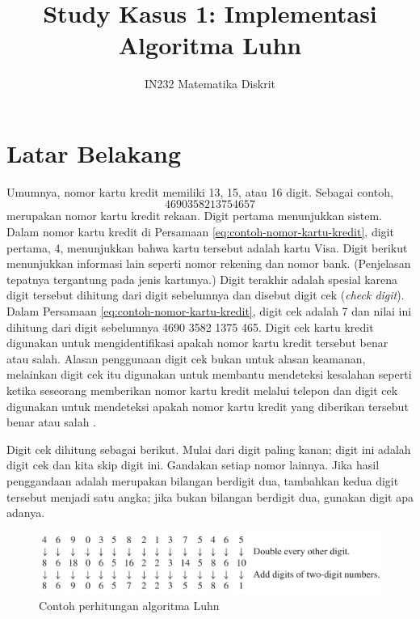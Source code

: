 \documentclass{article}
\title{Study Kasus 1: Implementasi Algoritma Luhn}
\author{IN232 Matematika Diskrit}
\date{}
\theoremstyle{plain}
\begin{document}
\maketitle


\section*{Latar Belakang}
Umumnya, nomor kartu kredit memiliki 13, 15, atau 16 digit. Sebagai contoh,
\begin{equation}
	4690 3582 1375 4657
	\label{eq:contoh-nomor-kartu-kredit}
\end{equation}
merupakan nomor kartu kredit rekaan. Digit pertama menunjukkan sistem. Dalam nomor kartu kredit di Persamaan \eqref{eq:contoh-nomor-kartu-kredit}, digit pertama, 4, menunjukkan bahwa kartu tersebut adalah kartu Visa. Digit berikut menunjukkan informasi lain seperti nomor rekening dan nomor bank. (Penjelasan tepatnya tergantung pada jenis kartunya.) Digit terakhir adalah spesial karena digit tersebut dihitung dari digit sebelumnya dan disebut digit cek (\textit{check digit}). Dalam Persamaan \eqref{eq:contoh-nomor-kartu-kredit}, digit cek adalah 7 dan nilai ini dihitung dari digit sebelumnya 4690 3582 1375 465. Digit cek kartu kredit digunakan untuk mengidentifikasi apakah nomor kartu kredit tersebut benar atau salah. Alasan penggunaan digit cek bukan untuk alasan keamanan, melainkan digit cek itu digunakan untuk membantu mendeteksi kesalahan seperti ketika seseorang memberikan nomor kartu kredit melalui telepon dan digit cek digunakan untuk mendeteksi apakah nomor kartu kredit yang diberikan tersebut benar atau salah \citep{johnsonbaugh2009discrete}.

Digit cek dihitung sebagai berikut. Mulai dari digit paling kanan; digit ini adalah digit cek dan kita skip digit ini. Gandakan setiap nomor lainnya. Jika hasil penggandaan adalah merupakan bilangan berdigit dua, tambahkan kedua digit tersebut menjadi satu angka; jika bukan bilangan berdigit dua, gunakan digit apa adanya.

\begin{figure}[!ht]
	\centering
	\includegraphics[scale=.25]{images/contoh-perhitungan-luhn}
	\caption{Contoh perhitungan algoritma Luhn}
	\label{fig:contoh-perhitungan-luhn}
\end{figure}
\end{document}
